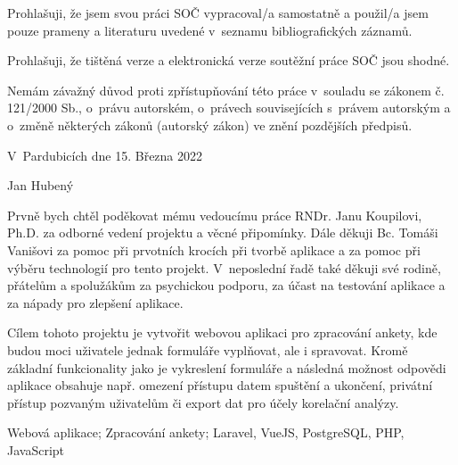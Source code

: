 
\noindent Prohlašuji, že jsem svou práci SOČ vypracoval/a samostatně a použil/a jsem pouze prameny a literaturu uvedené v~seznamu bibliografických záznamů.

\noindent Prohlašuji, že tištěná verze a elektronická verze soutěžní práce SOČ jsou shodné.

\noindent Nemám závažný důvod proti zpřístupňování této práce v~souladu se zákonem č. 121/2000 Sb., o~právu autorském, o~právech souvisejících s~právem autorským a o~změně některých zákonů (autorský zákon) ve znění pozdějších předpisů.  

\vspace{24 pt}

\noindent V~Pardubicích dne 15. Března 2022 \dotfill{} 

\hspace{8cm} Jan Hubený

\cleardoublepage

\vspace*{0.8\textheight}

\noindent
Prvně bych chtěl poděkovat mému vedoucímu práce RNDr. Janu Koupilovi, Ph.D. za odborné vedení projektu a věcné připomínky. Dále děkuji Bc. Tomáši Vanišovi za pomoc při prvotních krocích při tvorbě aplikace a za pomoc při výběru technologií pro tento projekt. V~neposlední řadě také děkuji své rodině, přátelům a spolužákům za psychickou podporu, za účast na testování aplikace a za nápady pro zlepšení aplikace.

\cleardoublepage


\noindent 
Cílem tohoto projektu je vytvořit webovou aplikaci pro zpracování ankety, kde budou moci uživatele jednak formuláře vyplňovat, ale i spravovat. Kromě základní funkcionality jako je vykreslení formuláře a následná možnost odpovědi aplikace obsahuje např. omezení přístupu datem spuštění a ukončení, privátní přístup pozvaným uživatelům či export dat pro účely korelační analýzy.

\vspace{18pt}


\noindent Webová aplikace; Zpracování ankety; Laravel, VueJS, PostgreSQL, PHP, JavaScript

\vspace{18pt}

